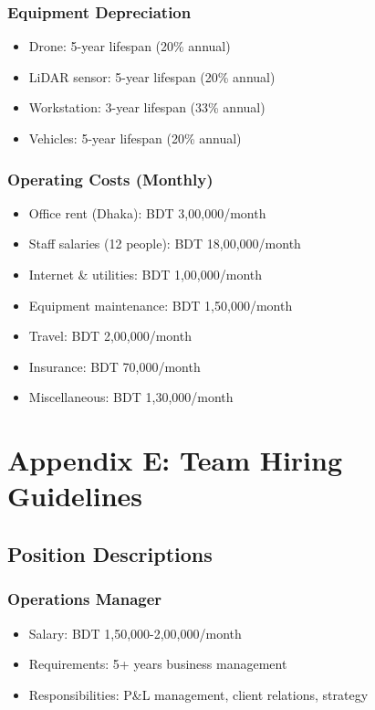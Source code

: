 \subsection*{Equipment Depreciation}

\begin{itemize}
    \item Drone: 5-year lifespan (20\% annual)
    \item LiDAR sensor: 5-year lifespan (20\% annual)
    \item Workstation: 3-year lifespan (33\% annual)
    \item Vehicles: 5-year lifespan (20\% annual)
\end{itemize}

\subsection*{Operating Costs (Monthly)}

\begin{itemize}
    \item Office rent (Dhaka): BDT 3,00,000/month
    \item Staff salaries (12 people): BDT 18,00,000/month
    \item Internet \& utilities: BDT 1,00,000/month
    \item Equipment maintenance: BDT 1,50,000/month
    \item Travel: BDT 2,00,000/month
    \item Insurance: BDT 70,000/month
    \item Miscellaneous: BDT 1,30,000/month
\end{itemize}

\chapter*{Appendix E: Team Hiring Guidelines}

\section*{Position Descriptions}

\subsection*{Operations Manager}

\begin{itemize}
    \item Salary: BDT 1,50,000-2,00,000/month
    \item Requirements: 5+ years business management
    \item Responsibilities: P\&L management, client relations, strategy
\end{itemize}

